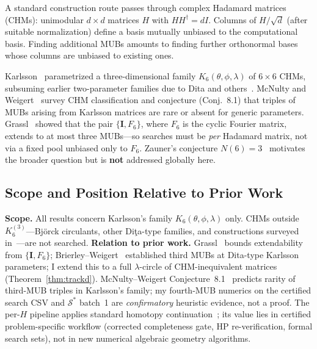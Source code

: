 \documentclass[onecolumn]{IEEEtran}
\begin{document}
A standard construction route passes through complex Hadamard matrices (CHMs): unimodular $d\times d$ matrices $H$ with $HH^\dagger=dI$.
Columns of $H/\sqrt{d}$ (after suitable normalization) define a basis mutually unbiased to the computational basis.
Finding additional MUBs amounts to finding further orthonormal bases whose columns are unbiased to existing ones.

Karlsson~\cite{Karlsson2011} parametrized a three-dimensional family $K_6(\theta,\phi,\lambda)$ of $6\times6$ CHMs, subsuming earlier two-parameter families due to Dita and others~\cite{Dita2009, McNulty2024}.
McNulty and Weigert~\cite{McNulty2024} survey CHM classification and conjecture (Conj.~8.1) that triples of MUBs arising from Karlsson matrices are rare or absent for generic parameters.
Grassl~\cite{Grassl2004} showed that the pair $\{\mathbf{I},F_6\}$, where $F_6$ is the cyclic Fourier matrix, extends to at most three MUBs---so searches must be \emph{per} Hadamard matrix, not via a fixed pool unbiased only to $F_6$.
Zauner's conjecture $N(6)=3$~\cite{Zauner1999, Scott2010} motivates the broader question but is \textbf{not} addressed globally here.

\subsection{Scope and Position Relative to Prior Work}
\label{sec:prior}
\textbf{Scope.} All results concern Karlsson's family $K_6(\theta,\phi,\lambda)$ only.
CHMs outside $K_6^{(3)}$---Bj\"orck circulants, other Di\c{t}a-type families, and constructions surveyed in~\cite{McNulty2024}---are not searched.
\textbf{Relation to prior work.}
Grassl~\cite{Grassl2004} bounds extendability from $\{\mathbf{I},F_6\}$; Brierley--Weigert~\cite{Brierley2009} established third MUBs at Dita-type Karlsson parameters; I extend this to a full $\lambda$-circle of CHM-inequivalent matrices (Theorem~\ref{thm:trackd}).
McNulty--Weigert Conjecture~8.1~\cite{McNulty2024} predicts rarity of third-MUB triples in Karlsson's family; my fourth-MUB numerics on the certified search CSV and $\mathcal{S}^*$ batch~1 are \emph{confirmatory} heuristic evidence, not a proof.
The per-$H$ pipeline applies standard homotopy continuation~\cite{HomotopyContinuation}; its value lies in certified problem-specific workflow (corrected completeness gate, HP re-verification, formal search sets), not in new numerical algebraic geometry algorithms.
\end{document}
